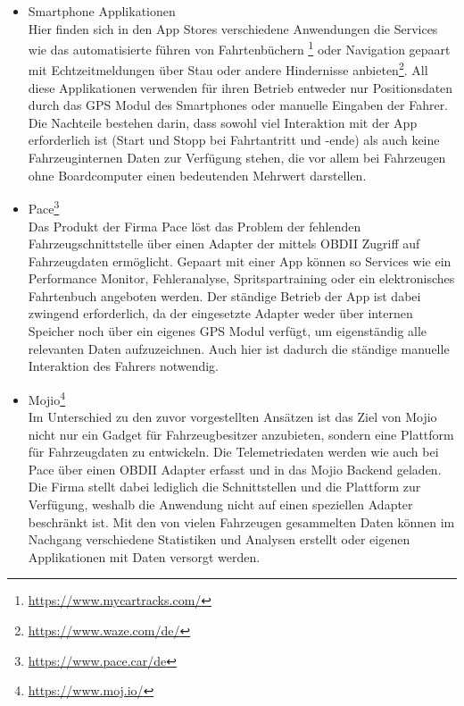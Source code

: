 \begin{itemize}
\item Smartphone Applikationen \\
Hier finden sich in den App Stores verschiedene Anwendungen die Services wie das automatisierte führen von Fahrtenbüchern \footnote{\url{https://www.mycartracks.com/}} oder Navigation gepaart mit Echtzeitmeldungen über Stau oder andere Hindernisse anbieten\footnote{\url{https://www.waze.com/de/}}. All diese Applikationen verwenden für ihren Betrieb entweder nur Positionsdaten durch das GPS Modul des Smartphones oder manuelle Eingaben der Fahrer. Die Nachteile bestehen darin, dass sowohl viel Interaktion mit der App erforderlich ist (Start und Stopp bei Fahrtantritt und -ende) als auch keine Fahrzeuginternen Daten zur Verfügung stehen, die vor allem bei Fahrzeugen ohne Boardcomputer einen bedeutenden Mehrwert darstellen.
\item Pace\footnote{\url{https://www.pace.car/de}}\\
Das Produkt der Firma Pace löst das Problem der fehlenden Fahrzeugschnittstelle über einen Adapter der mittels OBDII Zugriff auf Fahrzeugdaten ermöglicht. Gepaart mit einer App können so Services wie ein Performance Monitor, Fehleranalyse, Spritspartraining oder ein elektronisches Fahrtenbuch angeboten werden. Der ständige Betrieb der App ist dabei zwingend erforderlich, da der eingesetzte Adapter weder über internen Speicher noch über ein eigenes GPS Modul verfügt, um eigenständig alle relevanten Daten aufzuzeichnen. Auch hier ist dadurch die ständige manuelle Interaktion des Fahrers notwendig.
\item Mojio\footnote{\url{https://www.moj.io/}}\\
Im Unterschied zu den zuvor vorgestellten Ansätzen ist das Ziel von Mojio nicht nur ein Gadget für Fahrzeugbesitzer anzubieten, sondern eine Plattform für Fahrzeugdaten zu entwickeln. Die Telemetriedaten werden wie auch bei Pace über einen OBDII Adapter erfasst und in das Mojio Backend geladen. Die Firma stellt dabei lediglich die Schnittstellen und die Plattform zur Verfügung, weshalb die Anwendung nicht auf einen speziellen Adapter beschränkt ist. Mit den von vielen Fahrzeugen gesammelten Daten können im Nachgang verschiedene Statistiken und Analysen erstellt oder eigenen Applikationen mit Daten versorgt werden.
\end{itemize}

